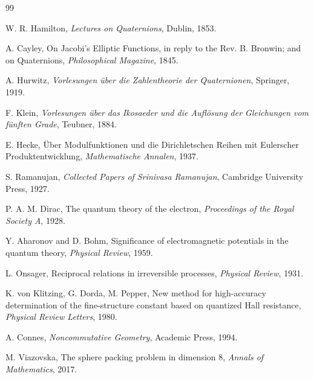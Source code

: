 \documentclass[11pt,a4paper]{article}
\theoremstyle{definition}
\begin{document}
	\begin{thebibliography}{99}
		
		W. R. Hamilton,
		\emph{Lectures on Quaternions},
		Dublin, 1853.
		
		A. Cayley,
		On Jacobi's Elliptic Functions, in reply to the Rev. B. Bronwin; and on Quaternions,
		\emph{Philosophical Magazine}, 1845.
		
		A. Hurwitz,
		\emph{Vorlesungen über die Zahlentheorie der Quaternionen},
		Springer, 1919.
		
		F. Klein,
		\emph{Vorlesungen über das Ikosaeder und die Auflösung der Gleichungen vom fünften Grade},
		Teubner, 1884.
		
		E. Hecke,
		Über Modulfunktionen und die Dirichletschen Reihen mit Eulerscher Produktentwicklung,
		\emph{Mathematische Annalen}, 1937.
		
		S. Ramanujan,
		\emph{Collected Papers of Srinivasa Ramanujan},
		Cambridge University Press, 1927.
		
		P. A. M. Dirac,
		The quantum theory of the electron,
		\emph{Proceedings of the Royal Society A}, 1928.
		
		Y. Aharonov and D. Bohm,
		Significance of electromagnetic potentials in the quantum theory,
		\emph{Physical Review}, 1959.
		
		L. Onsager,
		Reciprocal relations in irreversible processes,
		\emph{Physical Review}, 1931.
		
		K. von Klitzing, G. Dorda, M. Pepper,
		New method for high-accuracy determination of the fine-structure constant based on quantized Hall resistance,
		\emph{Physical Review Letters}, 1980.
		
		A. Connes,
		\emph{Noncommutative Geometry},
		Academic Press, 1994.
		
		M. Viazovska,
		The sphere packing problem in dimension 8,
		\emph{Annals of Mathematics}, 2017.
		
	\end{thebibliography}
	
\end{document}
